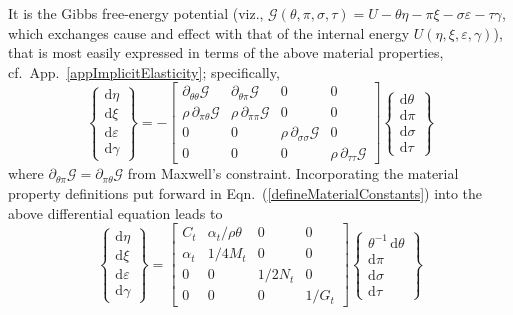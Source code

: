 It is the Gibbs free-energy potential (viz., $\mathcal{G} ( \theta , \pi , \sigma , \tau ) = U - \theta \eta - \pi \xi - \sigma \varepsilon - \tau \gamma$, which exchanges cause and effect with that of the internal energy $U ( \eta , \xi , \varepsilon , \gamma )$), that is most easily expressed in terms of the above material properties, cf.\ App.~\ref{appImplicitElasticity}; specifically,
\begin{displaymath}
\left\{ \begin{matrix}
\mathrm{d}\eta \\ \mathrm{d} \xi \\
\mathrm{d} \varepsilon \\ \mathrm{d} \gamma
\end{matrix} \right\} = -\begin{bmatrix}
\partial_{\theta\theta} \mathcal{G} & 
\partial_{\theta\pi} \mathcal{G} & 0 & 0 \\ 
\rho \, \partial_{\pi\theta} \mathcal{G} & 
\rho \, \partial_{\pi\pi} \mathcal{G} & 0 & 0 \\
0 & 0 & \rho \, \partial_{\sigma\sigma} \mathcal{G} & 0 \\
0 & 0 & 0 & \rho \, \partial_{\tau\tau} \mathcal{G}
\end{bmatrix} 
\left\{ \begin{matrix}
\mathrm{d} \theta \\ \mathrm{d} \pi \\
\mathrm{d} \sigma \\ \mathrm{d} \tau
\end{matrix} \right\} 
\end{displaymath}
where $\partial_{\theta\pi} \mathcal{G} = \partial_{\pi\theta} \mathcal{G}$ from Maxwell's constraint.  Incorporating the material property definitions put forward in Eqn.~(\ref{defineMaterialConstants}) into the above differential equation leads to
\begin{displaymath}
\label{GibbsMembrane}
\left\{ \begin{matrix}
\mathrm{d}\eta \\ \mathrm{d} \xi \\
\mathrm{d} \varepsilon \\ \mathrm{d} \gamma
\end{matrix} \right\} = \begin{bmatrix}
C_t & \alpha_t / \rho \theta & 0 & 0 \\ 
\alpha_t & 1 / 4 M_t & 0 & 0 \\
0 & 0 & 1 / 2 N_t & 0 \\
0 & 0 & 0 & 1 / G_t
\end{bmatrix} 
\left\{ \begin{matrix}
\theta^{-1} \, \mathrm{d} \theta \\ \mathrm{d} \pi \\
\mathrm{d} \sigma \\ \mathrm{d} \tau
\end{matrix} \right\} 
\end{displaymath}
